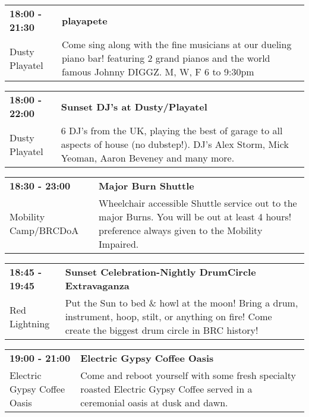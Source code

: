 \begin{tabular}{ p{1in} p{2.2in} }
    \textbf{18:00 - 21:30} & \textbf{playapete} \\
    Dusty Playatel \newline  & Come sing along with the fine musicians at our dueling piano bar! featuring 2 grand pianos and the world famous Johnny DIGGZ.  M, W, F  6 to 9:30pm \\
    \hline 
\end{tabular}
    
\begin{tabular}{ p{1in} p{2.2in} }
    \textbf{18:00 - 22:00} & \textbf{Sunset DJ's at Dusty/Playatel} \\
    Dusty Playatel \newline  & 6 DJ's from the UK, playing the best of garage to all aspects of house (no dubstep!). DJ's Alex Storm, Mick Yeoman, Aaron Beveney and many more. \\
    \hline 
\end{tabular}
    
\begin{tabular}{ p{1in} p{2.2in} }
    \textbf{18:30 - 23:00} & \textbf{Major Burn Shuttle} \\
    Mobility Camp/BRCDoA \newline  & Wheelchair accessible Shuttle service out to the major Burns. You will be out at least 4 hours! preference always given to the Mobility Impaired. \\
    \hline 
\end{tabular}
    
\begin{tabular}{ p{1in} p{2.2in} }
    \textbf{18:45 - 19:45} & \textbf{Sunset Celebration-Nightly DrumCircle Extravaganza} \\
    Red Lightning \newline  & Put the Sun to bed \& howl at the moon! Bring a drum, instrument, hoop, stilt, or anything on fire! Come create the biggest drum circle in BRC history! \\
    \hline 
\end{tabular}
    
\begin{tabular}{ p{1in} p{2.2in} }
    \textbf{19:00 - 21:00} & \textbf{Electric Gypsy Coffee Oasis} \\
    Electric Gypsy Coffee Oasis \newline  & Come and reboot yourself with some fresh specialty roasted Electric Gypsy Coffee served in a ceremonial oasis at dusk and dawn. \\
    \hline 
\end{tabular}
    
